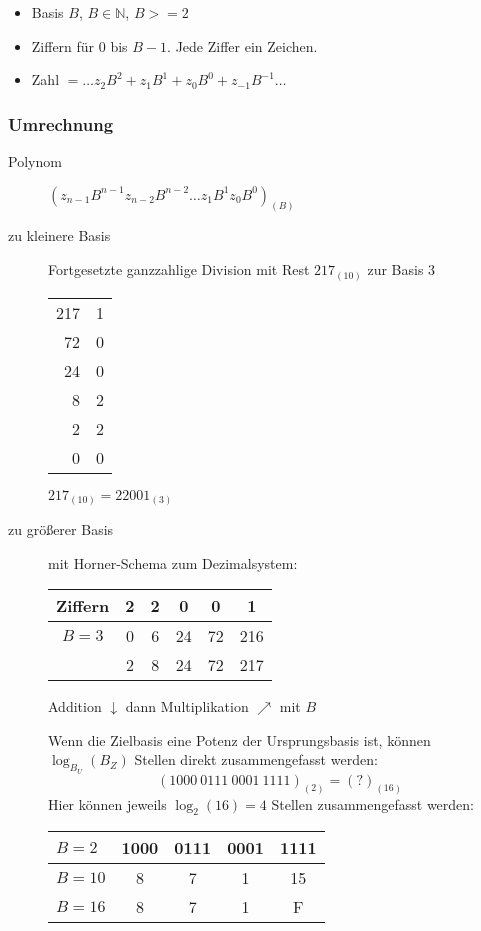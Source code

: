 \begin{itemize}
    \item Basis $B$, $B \in \mathbb{N}$, $B>=2$
    \item Ziffern für $0$ bis $B-1$. Jede Ziffer ein Zeichen.
    \item Zahl $= \dots z_2B^2+z_1B^1+z_0B^0+z_{-1}B^{-1} \dots$
\end{itemize}
\subsubsection{Umrechnung}
\begin{description}
    \item[Polynom] $(z_{n-1}B^{n-1}z_{n-2}B^{n-2} \dots z_1B^{1}z_0B^{0})_{(B)}$
    \item[zu kleinere Basis] Fortgesetzte ganzzahlige Division mit Rest
    $217_{(10)}$ zur Basis 3 \\
    \begin{tabular}{r c}
        217 & 1 \\
        72  & 0 \\
        24  & 0 \\
        8   & 2 \\
        2   & 2 \\
        0   & 0
    \end{tabular} $217_{(10)} = 22001_{(3)}$
    \item[zu größerer Basis] mit Horner-Schema zum Dezimalsystem:

    \begin{tabular}{|c||c|c|c|c|c|} \hline
    Ziffern & 2 & 2 & 0  & 0  & 1   \\ \hline \hline
    $B=3$   & 0 & 6 & 24 & 72 & 216 \\ \hline
    & 2 & 8 & 24 & 72 & 217 \\ \hline
    \end{tabular} Addition $\downarrow$ dann Multiplikation $\nearrow$ mit $B$

    Wenn die Zielbasis eine Potenz der Ursprungsbasis ist, können $\log_{B_U}(B_Z)$ Stellen direkt zusammengefasst werden:
    $$(1000\ 0111\ 0001\ 1111)_{(2)}=(?)_{(16)}$$
    Hier können jeweils $\log_2(16)=4$ Stellen zusammengefasst werden:

    \begin{tabular}[t]{|l||c|c|c|c|} \hline
    $B = 2$  & 1000 & 0111 & 0001 & 1111 \\ \hline
    $B = 10$ & 8    & 7    & 1    & 15   \\ \hline
    $B = 16$ & 8    & 7    & 1    & F    \\ \hline
    \end{tabular}
\end{description}